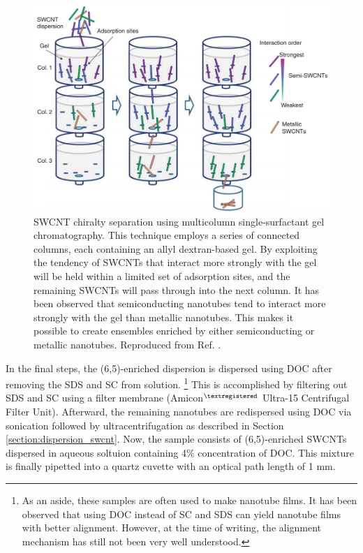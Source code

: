 \begin{figure}[H]
	\centering
	\includegraphics[scale=1.7]{images/chapter_methods/multi_column_kataura}
	\caption{SWCNT chiralty separation using multicolumn single-surfactant gel chromatography. This technique employs a series of connected columns, each containing an allyl dextran-based gel. By exploiting the tendency of SWCNTs that interact more strongly with the gel will be held within a limited set of adsorption sites, and the remaining SWCNTs will pass through into the next column. It has been observed that semiconducting nanotubes tend to interact more strongly with the gel than metallic nanotubes. This makes it possible to create ensembles enriched by either semiconducting or metallic nanotubes. Reproduced from Ref. \cite{liu2011large}.}
	\label{fig:gel_chromatography_kataura}
\end{figure}

In the final steps, the (6,5)-enriched dispersion is dispersed using DOC after removing the SDS and SC from solution. \footnote{As an aside, these samples are often used to make nanotube films. It has been observed that using DOC instead of SC and SDS can yield nanotube films with better alignment. However, at the time of writing, the alignment mechanism has still not been very well understood.} This is accomplished by filtering out SDS and SC using a filter membrane (Amicon$^{\tiny\textregistered}$ Ultra-15 Centrifugal Filter Unit). Afterward, the remaining nanotubes are redispersed using DOC via sonication followed by ultracentrifugation as described in Section \ref{section:dispersion_swcnt}. Now, the sample consists of (6,5)-enriched SWCNTs dispersed in aqueous soltuion containing 4\% concentration of DOC. This mixture is finally pipetted into a quartz cuvette with an optical path length of 1 mm.



